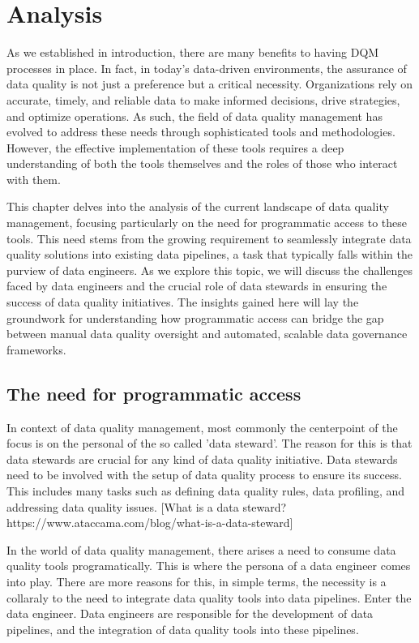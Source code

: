 \chapter{Analysis}
As we established in introduction, there are many benefits to having DQM processes in place. In fact, in today's data-driven environments, the assurance of data quality is not just a preference but a critical necessity. Organizations rely on accurate, timely, and reliable data to make informed decisions, drive strategies, and optimize operations. As such, the field of data quality management has evolved to address these needs through sophisticated tools and methodologies. However, the effective implementation of these tools requires a deep understanding of both the tools themselves and the roles of those who interact with them.


This chapter delves into the analysis of the current landscape of data quality management, focusing particularly on the need for programmatic access to these tools. This need stems from the growing requirement to seamlessly integrate data quality solutions into existing data pipelines, a task that typically falls within the purview of data engineers. As we explore this topic, we will discuss the challenges faced by data engineers and the crucial role of data stewards in ensuring the success of data quality initiatives. The insights gained here will lay the groundwork for understanding how programmatic access can bridge the gap between manual data quality oversight and automated, scalable data governance frameworks.


\section{The need for programmatic access}

In context of data quality management, most commonly the centerpoint of the focus is on the personal of the so called 'data steward'. The reason for this is that data stewards are crucial
for any kind of data quality initiative. Data stewards need to be involved with the setup of data quality process to ensure its success. This includes many tasks such as defining data quality rules,
data profiling, and addressing data quality issues. [What is a data steward? https://www.ataccama.com/blog/what-is-a-data-steward]

In the world of data quality management, there arises a need to consume data quality tools programatically. This is where the persona of a data engineer comes into play. There are more reasons for this, in simple terms,
the necessity is a collaraly to the need to integrate data quality tools into data pipelines. Enter the data engineer. Data engineers are responsible for the development of data pipelines, and the integration of data quality tools into these pipelines. 

